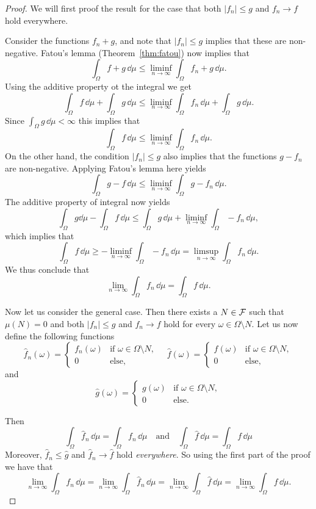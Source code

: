 \begin{proof}
We will first proof the result for the case that both $|f_n| \le g$ and $f_n \to f$ hold everywhere.  

Consider the functions $f_n+g$, and note that $|f_n| \le g$ implies that these are non-negative. Fatou's lemma (Theorem~\ref{thm:fatou}) now implies that
\[
	\int_\Omega f + g \, \dd \mu \le \liminf_{n \to \infty} \int_\Omega f_n + g \, \dd \mu.
\] 
Using the additive property ot the integral we get
\[
	\int_\Omega f \, \dd \mu + \int_\Omega g \, \dd \mu 
	\le \liminf_{n \to \infty} \int_\Omega f_n \, \dd \mu + \int_\Omega g \, \dd \mu.
\]
Since $\int_\Omega g \, \dd \mu < \infty$ this implies that
\[
	\int_\Omega f \, \dd \mu \le \liminf_{n \to \infty} \int_\Omega f_n \, \dd \mu.
\]
On the other hand, the condition $|f_n| \le g$ also implies that the functions $g - f_n$ are non-negative. Applying Fatou's lemma here yields
\[
	\int_\Omega g - f \, \dd \mu \le \liminf_{n \to \infty} \int_\Omega g - f_n \, \dd \mu.
\]
The additive property of integral now yields
\[
	\int_\Omega g \dd \mu - \int_\Omega f \, \dd \mu \le \int_\Omega g \, \dd \mu 
	+ \liminf_{n \to \infty} \int_\Omega - f_n \, \dd \mu,
\]
which implies that 
\[
	\int_\Omega f \, \dd \mu \ge - \liminf_{n \to \infty} \int_\Omega - f_n \, \dd \mu 
	= \limsup_{n \to \infty} \int_\Omega f_n \, \dd \mu.
\]
We thus conclude that
\[
	\lim_{n \to \infty} \int_\Omega f_n \, \dd \mu = \int_\Omega f \, \dd \mu.
\]

Now let us consider the general case. Then there exists a $N \in \mathcal F$ such that $\mu(N) = 0$ and both $|f_n| \le g$ and $f_n \to f$ hold for every $\omega \in \Omega \setminus N$. Let us now define the following functions
\[
	\hat{f}_n(\omega) = \begin{cases}
		f_n(\omega) &\text{if } \omega \in \Omega \setminus N,\\
		0 &\text{else,}
	\end{cases}
	\quad 
	\hat{f}(\omega) = \begin{cases}
		f(\omega) &\text{if } \omega \in \Omega \setminus N,\\
		0 &\text{else,}
	\end{cases}
\]
and
\[
	\hat{g}(\omega) = \begin{cases}
		g(\omega) &\text{if } \omega \in \Omega \setminus N,\\
		0 &\text{else.}
	\end{cases}
\]

Then 
\[
	\int_\Omega \hat{f}_n \, \dd \mu = \int_\Omega f_n \, \dd \mu \quad \text{and} \quad
	\int_\Omega \hat{f} \, \dd \mu = \int_\Omega f \, \dd \mu
\]
Moreover, $\hat{f}_n \le \hat{g}$ and $\hat{f}_n \to \hat{f}$ hold \emph{everywhere}. So using the first part of the proof we have that
\[
	\lim_{n \to \infty} \int_\Omega f_n \, \dd \mu = \lim_{n \to \infty} \int_\Omega \hat{f}_n \, \dd \mu
	= \lim_{n \to \infty} \int_\Omega \hat{f} \, \dd \mu = \lim_{n \to \infty} \int_\Omega f \, \dd \mu.
\]
\end{proof}

